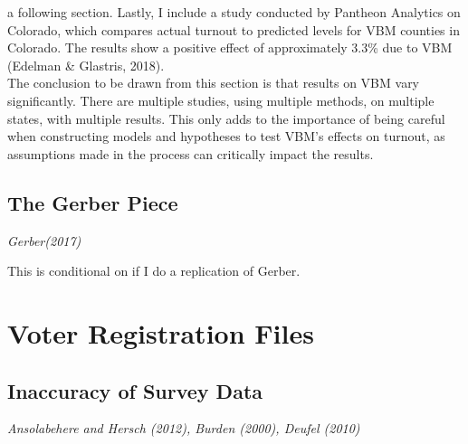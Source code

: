 \documentclass[12pt,twoside]{reedthesis}
\begin{document}
  a following section. Lastly, I include a study conducted by Pantheon
  Analytics on Colorado, which compares actual turnout to predicted levels
  for VBM counties in Colorado. The results show a positive effect of
  approximately 3.3\% due to VBM (Edelman \& Glastris, 2018).\\
  The conclusion to be drawn from this section is that results on VBM vary
  significantly. There are multiple studies, using multiple methods, on
  multiple states, with multiple results. This only adds to the importance
  of being careful when constructing models and hypotheses to test VBM's
  effects on turnout, as assumptions made in the process can critically
  impact the results.
  
  \subsection{The Gerber Piece}\label{the-gerber-piece}
  
  \emph{Gerber(2017)}
  
  This is conditional on if I do a replication of Gerber.
  
  \section{Voter Registration Files}\label{voter-registration-files}
  
  \subsection{Inaccuracy of Survey Data}\label{inaccuracy-of-survey-data}
  
  \emph{Ansolabehere and Hersch (2012), Burden (2000), Deufel (2010)}
  
\end{document}
